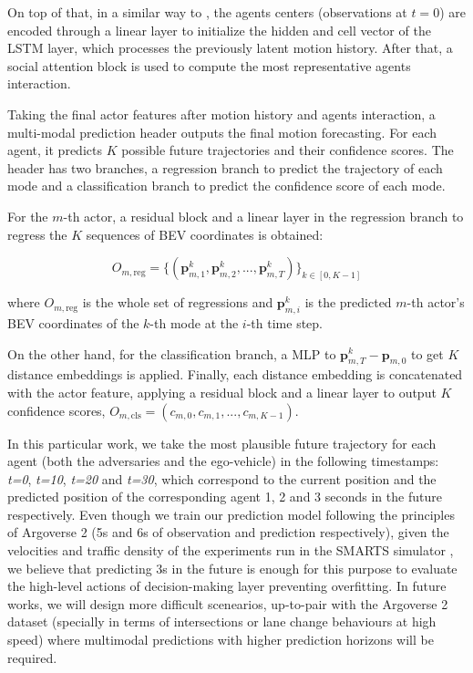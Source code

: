 On top of that, in a similar way to \cite{wang2022ganet}, the agents centers (observations at $t=0$) are encoded through a linear layer to initialize the hidden and cell vector of the LSTM layer, which processes the previously latent motion history. After that, a social attention block is used to compute the most representative agents interaction.

Taking the final actor features after motion history and agents interaction, a multi-modal prediction header outputs the final motion forecasting. For each agent, it predicts $K$ possible future trajectories and their confidence scores. The header has two branches, a regression branch to predict the trajectory of each mode and a classification branch to predict the confidence score of each mode.

For the $m$-th actor, a residual block and a linear layer in the regression branch to regress the $K$ sequences of BEV coordinates is obtained:

\begin{equation}
	O_{m, \text{reg}} = \{ (\mathbf{p}_{m,1}^k, \mathbf{p}_{m,2}^k, ..., \mathbf{p}_{m,T}^k) \}_{k \in [0, K-1]}
\end{equation}

where $O_{m, \text{reg}}$ is the whole set of regressions and $\mathbf{p}_{m,i}^k$ is the predicted $m$-th actor's BEV coordinates of the $k$-th mode at the $i$-th time step.

On the other hand, for the classification branch, a MLP to $\mathbf{p}_{m,T}^k - \mathbf{p}_{m,0}$ to get $K$ distance embeddings is applied. Finally, each distance embedding is concatenated with the actor feature, applying a residual block and a linear layer to output $K$ confidence scores, $O_{m, \text{cls}} = (c_{m,0}, c_{m,1}, ..., c_{m,K-1})$.

In this particular work, we take the most plausible future trajectory for each agent (both the adversaries and the ego-vehicle) in the following timestamps: \textit{t=0}, \textit{t=10}, \textit{t=20} and \textit{t=30}, which correspond to the current position and the predicted position of the corresponding agent 1, 2 and 3 seconds in the future respectively. Even though we train our prediction model following the principles of Argoverse 2 (5s and 6s of observation and prediction respectively), given the velocities and traffic density of the experiments run in the SMARTS simulator , we believe that predicting 3s in the future is enough for this purpose to evaluate the high-level actions of decision-making layer preventing overfitting. In future works, we will design more difficult scenearios, up-to-pair with the Argoverse 2 dataset (specially in terms of intersections or lane change behaviours at high speed) where multimodal predictions with higher prediction horizons will be required.

